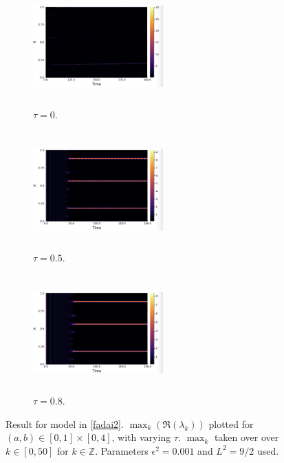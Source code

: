 \begin{figure}[H]
    \centering
    \begin{subfigure}[t]{0.32\textwidth}
        \centering
        \includegraphics[width=5cm,height = 4.5cm]{fad2t0.png}
        \caption{$\tau=0$.}
        \label{}
    \end{subfigure}
    \hfill
    \begin{subfigure}[t]{0.32\textwidth}
        \centering
        \includegraphics[width=5cm,height = 4.5cm]{fad2t05.png}
        \caption{$\tau=0.5$.}
        \label{}
    \end{subfigure}
    \hfill
    \begin{subfigure}[t]{0.32\textwidth}
        \centering
        \includegraphics[width=5cm,height = 4.5cm]{fad2t08.png}
        \caption{$\tau=0.8$.}
        \label{}
    \end{subfigure}
    \caption{Result for model in \eqref{fadai2}. $\max_k(\Re(\lambda_k))$ plotted for $(a,b)\in[0,1]\times[0,4]$, with varying $\tau$. $\max_k$ taken over over $k\in[0,50]$ for $k\in\mathbb{Z}$. Parameters $\epsilon^2=0.001$ and $L^2=9/2$ used.}
    \label{fig:fad2}
\end{figure}





